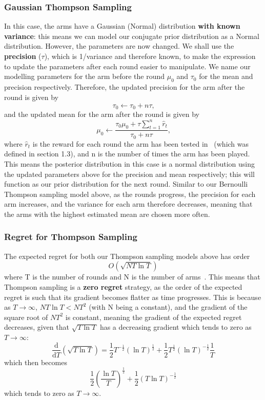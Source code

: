 \subsubsection{Gaussian Thompson Sampling}
In this case, the arms have a Gaussian (Normal) distribution \textbf{with known variance}: this means we can model our conjugate prior distribution as a Normal distribution.
However, the parameters are now changed.
We shall use the \textbf{precision} ($\tau$), which is 1/variance and therefore known, to make the expression to update the parameters after each round easier to manipulate.
We name our modelling parameters for the arm before the round $\mu_0$ and $\tau_0$ for the mean and precision respectively.
Therefore, the updated precision for the arm after the round is given by
\[\tau_0\xleftarrow{}\tau_0 + n\tau\text{,}\]
and the updated mean for the arm after the round is given by
\[\mu_0\xleftarrow{}\frac{\tau_0\mu_0 + \tau\sum_{t=1}^n\widehat{r}_t}{\tau_0 + n\tau}\text{,}\]
where $\widehat{r}_t$ is the reward for each round the arm has been tested in~\citep{agrawal2013further} (which was defined in section 1.3), and n is the number of times the arm has been played.
This means the posterior distribution in this case is a normal distribution using the updated parameters above for the precision and mean respectively;
this will function as our prior distribution for the next round.
Similar to our Bernoulli Thompson sampling model above, as the rounds progress, the precision for each arm increases, and the variance for each arm therefore decreases, meaning that the arms with the highest estimated mean are chosen more often.
\subsubsection{Regret for Thompson Sampling}
The expected regret for both our Thompson sampling models above has order
\[O\left(\sqrt{NT\ln{T}}\right)\]
where T is the number of rounds and N is the number of arms~\citep{agrawal2013further}.
This means that Thompson sampling is a \textbf{zero regret} strategy, as the order of the expected regret is such that its gradient becomes flatter as time progresses.
This is because as $T\to\infty$, $NT\ln{T} < NT^2$ (with N being a constant), and the gradient of the square root of $NT^2$ is constant, meaning the gradient of the expected regret decreases, given that $\sqrt{T\ln{T}}$ has a decreasing gradient which tends to zero as $T\to\infty$:
\newline
$$\frac{\mathrm{d} }{\mathrm{d} T} (\sqrt{T \ln{T}}) = \frac{1}{2}T^{-\frac{1}{2}}(\ln{T})^\frac{1}{2} + \frac{1}{2}T^{\frac{1}{2}}(\ln{T})^{-\frac{1}{2}}\frac{1}{T}$$
which then becomes
\newline
$$ \frac{1}{2}\left(\frac{\ln{T}}{T}\right)^\frac{1}{2} + \frac{1}{2}(T\ln{T})^{-\frac{1}{2}} $$
\newline
which tends to zero as $T\to\infty$.


